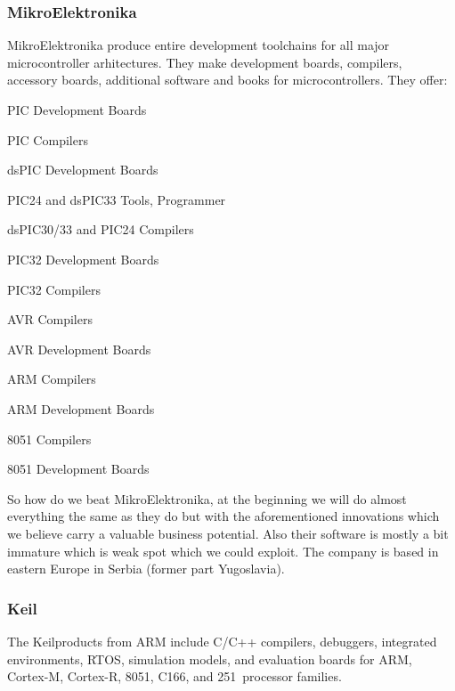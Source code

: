 \documentclass[a4paper,twoside,15pt]{book}
\begin{document}
		\subsubsection{MikroElektronika}
			MikroElektronika produce entire development toolchains for all major microcontroller arhitectures. They make development boards, compilers, accessory boards, additional software and books for microcontrollers. They offer:
			\begin{dinglist}{73}
				\item PIC Development Boards
				\item PIC Compilers
				\item dsPIC Development Boards
				\item PIC24 and dsPIC33 Tools, Programmer
				\item dsPIC30/33 and PIC24 Compilers
				\item PIC32 Development Boards
				\item PIC32 Compilers
				\item AVR Compilers
				\item AVR Development Boards
				\item ARM Compilers
				\item ARM Development Boards
				\item 8051 Compilers
				\item 8051 Development Boards
			\end{dinglist}

			So how do we beat MikroElektronika, at the beginning we will do almost everything the same as they do but with the aforementioned innovations which we believe carry a valuable business potential. Also their software is mostly a bit immature which is weak spot which we could exploit. The company is based in eastern Europe in Serbia (former part Yugoslavia).

		\subsubsection{Keil}
			The Keil\texttrademark products from ARM include C/C++ compilers, debuggers, integrated environments, RTOS, simulation models, and evaluation boards for ARM, Cortex-M, Cortex-R, 8051, C166, and 251~processor families.
\end{document}
